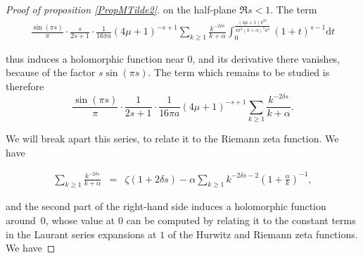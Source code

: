 \documentclass{jams-l}
\theoremstyle{definition}
\theoremstyle{remark}
\numberwithin{equation}{section}
\begin{document}
\begin{proof}[Proof of proposition \ref{PropMTilde2}]
                        \noindent on the half-plane $\Re s < 1$. The term
                        \[ \begin{array}{c}
                                \frac{\sin \left( \pi s \right)}{\pi} \cdot \frac{s}{2s+1} \cdot \frac{1}{16 \pi a} \left( 4 \mu + 1 \right)^{-s+1} \sum\limits_{k \geqslant 1} \frac{k^{-2 \delta s}}{k + \alpha} \int_0^{\frac{\left( 4 \mu + 1 \right) k^{2 \delta}}{4 \pi^2 \left( k + \alpha \right)^2 a^2}} \left( 1 + t \right)^{s-1} \mathrm{d}t
                            \end{array} \]
                        
                        \noindent thus induces a holomorphic function near $0$, and its derivative there vanishes, because of the factor $s \sin \left( \pi s \right)$. The term which remains to be studied is therefore
                        \begin{equation}
                        \label{EqArcsinhRemainingTermJ1}
                            \textstyle \frac{\sin \left( \pi s \right)}{\pi} \cdot \frac{1}{2s+1} \cdot \frac{1}{16 \pi a} \left( 4 \mu + 1 \right)^{-s+1} \sum\limits_{k \geqslant 1} \frac{k^{-2 \delta s}}{k + \alpha}.
                        \end{equation}
                        
                        \noindent We will break apart this series, to relate it to the Riemann zeta function. We have
                        
                        \[ \begin{array}{lll}
                                \sum\limits_{k \geqslant 1} \frac{k^{-2 \delta s}}{k + \alpha} & = &  \zeta \left( 1 + 2 \delta s \right) -  \alpha \sum\limits_{k \geqslant 1} k^{- 2 \delta s - 2} \left( 1 + \frac{\alpha}{k} \right)^{-1},
                            \end{array} \]
                        
                        \noindent and the second part of the right-hand side induces a holomorphic function around~$0$, whose value at $0$ can be computed by relating it to the constant terms in the Laurant series expansions at $1$ of the Hurwitz and Riemann zeta functions. We have
                        

\end{proof}
\end{document}
